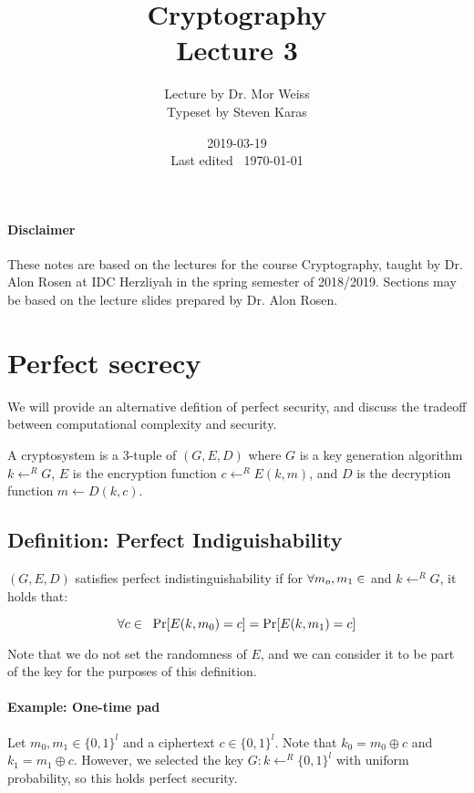 \documentclass{idc_msc}
\title{Cryptography \\\large Lecture 3}
\date{2019-03-19 \\ Last edited \currenttime\ \today}
\author{Lecture by Dr. Mor Weiss\\Typeset by Steven Karas}
\DeclareMathOperator*{\xor}{\oplus}
\let\Cipherspace\relax
\newcommand{\Cipherspace}{\texorpdfstring{\ensuremath{\mathcal{C}}}{C}}
\let\Messagespace\relax
\newcommand{\Messagespace}{\texorpdfstring{\ensuremath{\mathcal{P}}}{P}}
\begin{document}
\paragraph{Disclaimer}

These notes are based on the lectures for the course Cryptography, taught by Dr. Alon Rosen at IDC Herzliyah in the spring semester of 2018/2019.
Sections may be based on the lecture slides prepared by Dr. Alon Rosen.

\nocite{Goldreich:2000:FCB:519078}
\nocite{Cormen:2001:IA:580470}



\section{Perfect secrecy}

We will provide an alternative defition of perfect security, and discuss the tradeoff between computational complexity and security.

A cryptosystem is a 3-tuple of \((G,E,D)\) where \(G\) is a key generation algorithm \(k \gets^R G\), \(E\) is the encryption function \(c \gets^R E(k,m)\), and \(D\) is the decryption function \(m \gets D(k,c)\).

\subsection{Definition: Perfect Indiguishability}

\((G,E,D)\) satisfies perfect indistinguishability if for \(\forall m_o, m_1 \in \Messagespace\) and \(k \gets^R G\), it holds that:

\[
  \forall c \in \Cipherspace \;\; \Pr[E(k,m_0) = c] = \Pr[E(k,m_1) = c]
\]

Note that we do not set the randomness of \(E\), and we can consider it to be part of the key for the purposes of this definition.

\paragraph{Example: One-time pad}

Let \(m_0, m_1 \in \{0,1\}^l\) and a ciphertext \(c \in \{0,1\}^l\).
Note that \(k_0 = m_0 \xor c\) and \(k_1 = m_1 \xor c\).
However, we selected the key \(G : k \gets^R \{0,1\}^l\) with uniform probability, so this holds perfect security.
\end{document}
